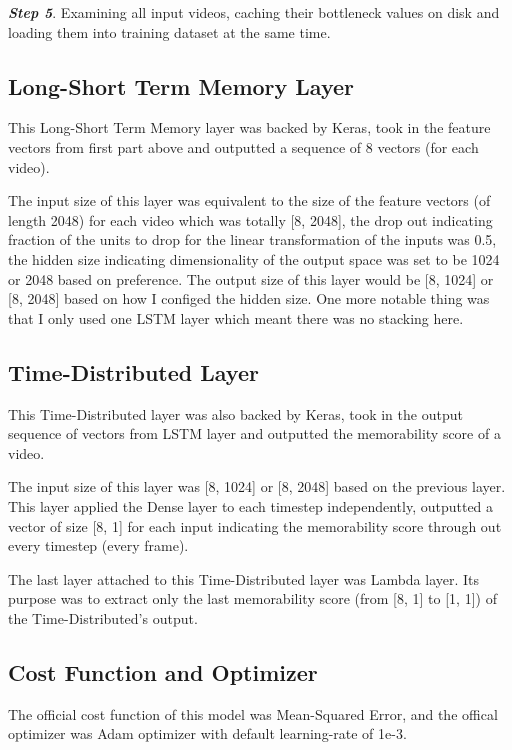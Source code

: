 \textbf{\emph{Step 5}}. Examining all input videos, caching their bottleneck values on disk and loading them into training dataset at the same time.

\subsection{Long-Short Term Memory Layer}
This Long-Short Term Memory layer was backed by Keras, took in the feature vectors from first part above and outputted a sequence of 8 vectors (for each video).

The input size of this layer was equivalent to the size of the feature vectors (of length 2048) for each video which was totally [8, 2048], the drop out indicating fraction of the units to drop for the linear transformation of the inputs was 0.5, the hidden size indicating dimensionality of the output space was set to be 1024 or 2048 based on preference. The output size of this layer would be [8, 1024] or [8, 2048] based on how I configed the hidden size. One more notable thing was that I only used one LSTM layer which meant there was no stacking here.

\subsection{Time-Distributed Layer}
This Time-Distributed layer was also backed by Keras, took in the output sequence of vectors from LSTM layer and outputted the memorability score of a video.

The input size of this layer was [8, 1024] or [8, 2048] based on the previous layer. This layer applied the Dense layer to each timestep independently, outputted a vector of size [8, 1] for each input indicating the memorability score through out every timestep (every frame).

The last layer attached to this Time-Distributed layer was Lambda layer. Its purpose was to extract only the last memorability score (from [8, 1] to [1, 1]) of the Time-Distributed's output.

\subsection{Cost Function and Optimizer}
The official cost function of this model was Mean-Squared Error, and the offical optimizer was Adam optimizer with default learning-rate of 1e-3.